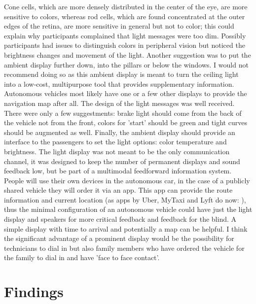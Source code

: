 Cone cells, which are more densely distributed in the center of the eye, are more sensitive to colors, whereas rod cells, which are found concentrated at the outer edges of the retina, are more sensitive in general but not to color; this could explain why participants complained that light messages were too dim. Possibly participants had issues to distinguish colors in peripheral vision but noticed the brightness changes and movement of the light.  %
Another suggestion was to put the ambient display further down, into the pillars or below the windows. I would not recommend doing so as this ambient display is meant to turn the ceiling light into a low-cost, multipurpose tool that provides supplementary information. Autonomous vehicles most likely have one or a few other displays to provide the navigation map after all. 
The design of the light messages was well received. There were only a few suggestments: brake light should come from the back of the vehicle not from the front, colors for 'start' should be green and tight curves should be augmented as well. Finally, the ambient display should provide an interface to the passengers to set the light options: color temperature and brightness. 
The light display was not meant to be the only communication channel, it was designed to keep the number of permanent displays and sound feedback low, but be part of a multimodal feedforward information system. People will use their own devices in the autonomous car, in the case of a publicly shared vehicle they will order it via an app. This app can provide the route information and current location (as apps by Uber, MyTaxi and Lyft do now: ), thus the minimal configuration of an autonomous vehicle could have just the light display and speakers for more critical feedback and feedback for the blind. A simple display with time to arrival and potentially a map can be helpful. I think the significant advantage of a prominent display would be the possibility for technicians to dial in but also family members who have ordered the vehicle for the family to dial in and have 'face to face contact'.

\section{Findings}
\label{sec:findings}
